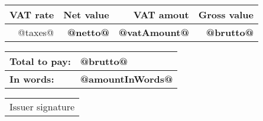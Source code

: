 \documentclass[a4paper,12pt,oneside]{mwart}
\makeatletter
\newcommand{\issuer}{@issuer@}
\newcommand{\netto}{@netto@}
\newcommand{\taxes}{@taxes@}
\newcommand{\vatAmount}{@vatAmount@}
\newcommand{\brutto}{@brutto@}
\newcommand{\amountInWords}{@amountInWords@}
\newcommand{\sig}{\@signature@{\Large{\color{Blue!60!black}{\issuer}}}}
\makeatother
\begin{document}
\begin{footnotesize}
	\bigskip
	\begin{flushright}
		\def\arraystretch{1.2}
		\begin{tabular}{| r | r | r | r |}
			\hline
				\textbf{VAT rate}&\textbf{Net value}&\textbf{VAT amout}&\textbf{Gross value} \\
			\hline
				\taxes
			\hline
				\multicolumn{1}{|c|}{\textbf{Total}}&\textbf{\netto}&\textbf{\vatAmount}&\textbf{\brutto} \\
			\hline
		\end{tabular}
	\end{flushright}
\end{footnotesize}

\bigskip
\begin{flushleft}
	\begin{small}
		\begin{tabular}{ l l }
			\textbf{Total to pay:}&\textbf{\brutto} \\
		\hline
			\textbf{In words:}&\textbf{\amountInWords}
		\end{tabular}
	\end{small}
\end{flushleft}

\bigskip
\begin{tabular}{ c }
\sig \\
\hline
Issuer signature
\end{tabular}
\end{document}
